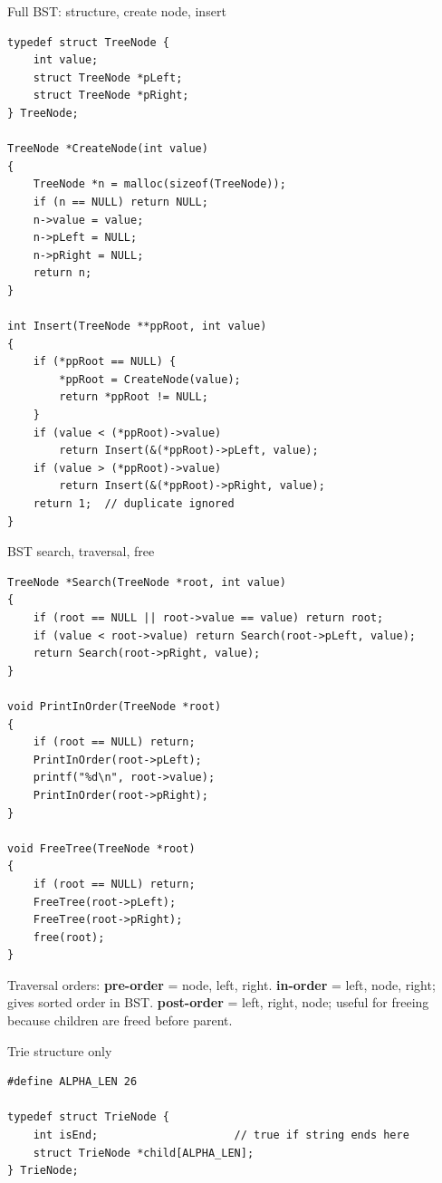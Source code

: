 \documentclass[9pt,a4paper]{article}
\begin{document}
\begin{codebox}{Full BST: structure, create node, insert}
\begin{lstlisting}[style=cstyle]
typedef struct TreeNode {
    int value;
    struct TreeNode *pLeft;
    struct TreeNode *pRight;
} TreeNode;

TreeNode *CreateNode(int value)
{
    TreeNode *n = malloc(sizeof(TreeNode));
    if (n == NULL) return NULL;
    n->value = value;
    n->pLeft = NULL;
    n->pRight = NULL;
    return n;
}

int Insert(TreeNode **ppRoot, int value)
{
    if (*ppRoot == NULL) {
        *ppRoot = CreateNode(value);
        return *ppRoot != NULL;
    }
    if (value < (*ppRoot)->value)
        return Insert(&(*ppRoot)->pLeft, value);
    if (value > (*ppRoot)->value)
        return Insert(&(*ppRoot)->pRight, value);
    return 1;  // duplicate ignored
}
\end{lstlisting}
\end{codebox}

\begin{codebox}{BST search, traversal, free}
\begin{lstlisting}[style=cstyle]
TreeNode *Search(TreeNode *root, int value)
{
    if (root == NULL || root->value == value) return root;
    if (value < root->value) return Search(root->pLeft, value);
    return Search(root->pRight, value);
}

void PrintInOrder(TreeNode *root)
{
    if (root == NULL) return;
    PrintInOrder(root->pLeft);
    printf("%d\n", root->value);
    PrintInOrder(root->pRight);
}

void FreeTree(TreeNode *root)
{
    if (root == NULL) return;
    FreeTree(root->pLeft);
    FreeTree(root->pRight);
    free(root);
}
\end{lstlisting}
\end{codebox}

\begin{note}
Traversal orders: \textbf{pre-order} = node, left, right. \textbf{in-order} = left, node, right; gives sorted order in BST. \textbf{post-order} = left, right, node; useful for freeing because children are freed before parent.
\end{note}

\begin{codebox}{Trie structure only}
\begin{lstlisting}[style=cstyle]
#define ALPHA_LEN 26

typedef struct TrieNode {
    int isEnd;                     // true if string ends here
    struct TrieNode *child[ALPHA_LEN];
} TrieNode;
\end{lstlisting}
\end{codebox}
\end{document}

